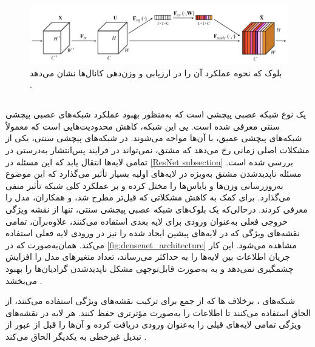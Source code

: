 \begin{figure}[h!]
    \centering
    \includegraphics[width=1\textwidth]{Images/Chapter2/squeeze and excitation.png}
    \caption{بلوک  که نحوه عملکرد آن را در ارزیابی و وزن‌دهی کانال‌ها نشان می‌دهد \cite{hu2018squeeze}.}
    \label{fig:se_block}
\end{figure}




\subsection{}

یک نوع شبکه‌ عصبی پیچشی است که به‌منظور بهبود عملکرد شبکه‌های عصبی پیچشی سنتی معرفی شده ‌است. یی این شبکه، کاهش محدودیت‌هایی است که معمولاً شبکه‌های پیچشی عمیق، با آن‌ها مواجه می‌شوند.
در شبکه‌های پیچشی سنتی، یکی از مشکلات اصلی زمانی رخ می‌دهد که مشتق، نمی‌تواند در فرایند پس‌انتشار به‌درستی در تمامی لایه‌ها انتقال یابد که این مسئله در
\autoref{ResNet subsection}
بررسی شده است. مسئله ناپدیدشدن مشتق به‌ویژه در لایه‌های اولیه بسیار تأثیر می‌گذارد که این موضوع به‌روزرسانی وزن‌ها و بایاس‌ها را مختل کرده و بر عملکرد کلی شبکه تأثیر منفی می‌گذارد.
برای کمک به کاهش مشکلاتی که قبل‌تر مطرح شد،
\cite{huang2017densely}
و همکاران، مدل 
 ‌را معرفی کردند. درحالی‌که یک بلوک‌های شبکه عصبی پیچشی‌ سنتی، تنها از نقشه ویژگی خروجی فعلی به‌عنوان ورودی برای لایه بعدی استفاده می‌کنند،
   علاوه‌برآن، تمامی نقشه‌های ویژگی که در لایه‌های پیشین ایجاد شده را نیز در ورودی لایه فعلی استفاده می‌کند. همان‌به‌صورت که در \autoref{fig:densenet_architecture} مشاهده می‌شود. این کار جریان اطلاعات بین لایه‌ها را به حداکثر می‌رساند، تعداد متغیرهای مدل را افزایش چشمگیری نمی‌دهد و به به‌صورت قابل‌توجهی مشکل ناپدیدشدن گرادیان‌ها را بهبود می‌بخشد .

شبکه‌های 
،
 برخلاف
  ها
که از جمع برای ترکیب نقشه‌های ویژگی استفاده می‌کنند، از الحاق 
   استفاده می‌کنند تا اطلاعات را به‌صورت مؤثرتری حفظ کنند. هر لایه در
    نقشه‌های ویژگی تمامی لایه‌های قبلی را به‌عنوان ورودی دریافت کرده و آن‌ها را قبل از عبور از تبدیل غیرخطی به یکدیگر الحاق می‌کند \cite{huang2017densely}.

